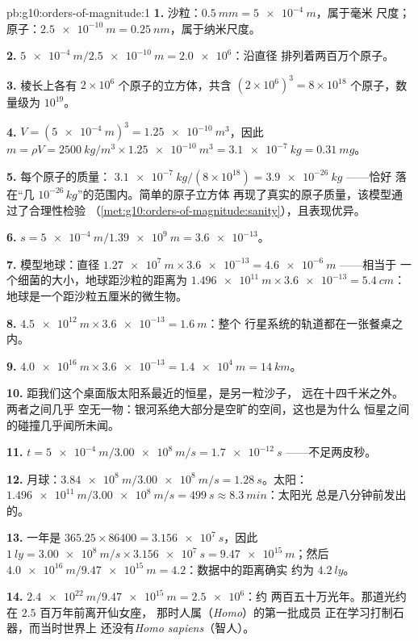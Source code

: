\begin{solution}{pb:g10:orders-of-magnitude:1}
\textbf{1.} 沙粒：$\qty{0.5}{mm} = \qty{5e-4}{m}$，属于毫米
尺度；原子：$\qty{2.5e-10}{m} = \qty{0.25}{nm}$，属于纳米尺度。

\textbf{2.} $\qty{5e-4}{m}/\qty{2.5e-10}{m} = \num{2.0e6}$：沿直径
排列着两百万个原子。

\textbf{3.} 棱长上各有 $2 \times 10^{6}$ 个原子的立方体，共含
$(2\times10^{6})^{3} = 8 \times 10^{18}$ 个原子，数量级为
$10^{19}$。

\textbf{4.} $V = (\qty{5e-4}{m})^{3} = \qty{1.25e-10}{m^3}$，因此
$m = \rho V = \qty{2500}{kg/m^3} \times \qty{1.25e-10}{m^3}
= \qty{3.1e-7}{kg} = \qty{0.31}{mg}$。

\textbf{5.} 每个原子的质量：
$\qty{3.1e-7}{kg}/(8\times10^{18}) = \qty{3.9e-26}{kg}$ ——恰好
落在“几 $10^{-26}\,\unit{kg}$”的范围内。简单的原子立方体
再现了真实的原子质量，该模型通过了合理性检验
（\cref{met:g10:orders-of-magnitude:sanity}），且表现优异。

\textbf{6.} $s = \qty{5e-4}{m}/\qty{1.39e9}{m} = \num{3.6e-13}$。

\textbf{7.} 模型地球：直径
$\qty{1.27e7}{m} \times \num{3.6e-13} = \qty{4.6e-6}{m}$ ——相当于
一个细菌的大小，地球距沙粒的距离为
$\qty{1.496e11}{m} \times \num{3.6e-13} = \qty{5.4}{cm}$：
地球是一个距沙粒五厘米的微生物。

\textbf{8.} $\qty{4.5e12}{m} \times \num{3.6e-13} = \qty{1.6}{m}$：整个
行星系统的轨道都在一张餐桌之内。

\textbf{9.} $\qty{4.0e16}{m} \times \num{3.6e-13} = \qty{1.4e4}{m}
= \qty{14}{km}$。

\textbf{10.} 距我们这个桌面版太阳系最近的恒星，是另一粒沙子，
远在十四千米之外。两者之间几乎
空无一物：银河系绝大部分是空旷的空间，这也是为什么
恒星之间的碰撞几乎闻所未闻。

\textbf{11.} $t = \qty{5e-4}{m}/\qty{3.00e8}{m/s} = \qty{1.7e-12}{s}$
——不足两皮秒。

\textbf{12.} 月球：$\qty{3.84e8}{m}/\qty{3.00e8}{m/s} =
\qty{1.28}{s}$。太阳：$\qty{1.496e11}{m}/\qty{3.00e8}{m/s} =
\qty{499}{s} \approx \qty{8.3}{min}$：太阳光
总是八分钟前发出的。

\textbf{13.} 一年是 $365.25 \times 86400 = \qty{3.156e7}{s}$，因此
$\qty{1}{ly} = \qty{3.00e8}{m/s} \times \qty{3.156e7}{s}
= \qty{9.47e15}{m}$；然后
$\qty{4.0e16}{m}/\qty{9.47e15}{m} = 4.2$：数据中的距离确实
约为 $\qty{4.2}{ly}$。

\textbf{14.} $\qty{2.4e22}{m}/\qty{9.47e15}{m} = \num{2.5e6}$：约
两百五十万光年。那道光约在 $2.5$ 百万年前离开仙女座，
那时人属（\emph{Homo}）的第一批成员
正在学习打制石器，而当时世界上
还没有\emph{Homo sapiens}（智人）。


\end{solution}
